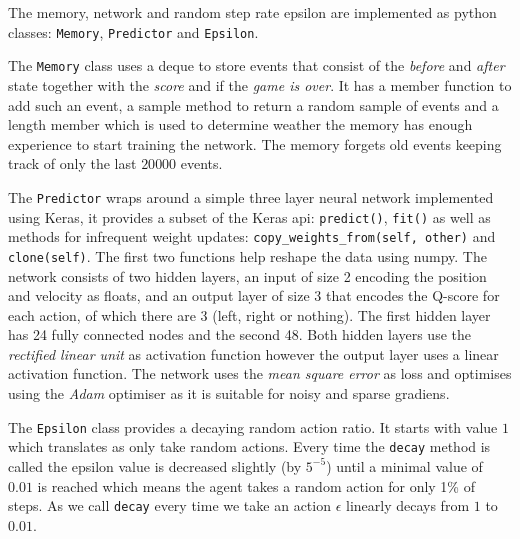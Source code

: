 The memory, network and random step rate epsilon are implemented as python classes: \texttt{Memory}, \texttt{Predictor} and \texttt{Epsilon}. 

The \texttt{Memory} class uses a deque to store events that consist of the \textit{before} and \textit{after} state together with the \textit{score} and if the \textit{game is over}. It has a member function to add such an event, a sample method to return a random sample of events and a length member which is used to determine weather the memory has enough experience to start training the network. The memory forgets old events keeping track of only the last $20 000$ events.

The \texttt{Predictor} wraps around a simple three layer neural network implemented using Keras\cite{keras}, it provides a subset of the Keras api: \texttt{predict()}, \texttt{fit()} as well as methods for infrequent weight updates: \texttt{copy\_weights\_from(self, other)} and \texttt{clone(self)}. The first two functions help reshape the data using numpy\cite{numpy}. The network consists of two hidden layers, an input of size 2 encoding the position and velocity as floats, and an output layer of size 3 that encodes the Q-score for each action, of which there are 3 (left, right or nothing).
The first hidden layer has 24 fully connected nodes and the second 48. Both hidden layers use the \textit{rectified linear unit} as activation function however the output layer uses a linear activation function. The network uses the \textit{mean square error} as loss and optimises using the \textit{Adam} optimiser as it is suitable for noisy and sparse gradiens.

The \texttt{Epsilon} class provides a decaying random action ratio. It starts with value $1$ which translates as only take random actions. Every time the \texttt{decay} method is called the epsilon value is decreased slightly (by $5^{-5}$) until a minimal value of $0.01$ is reached which means the agent takes a random action for only 1\% of steps. As we call \texttt{decay} every time we take an action $\epsilon$ linearly decays from $1$ to $0.01$.

